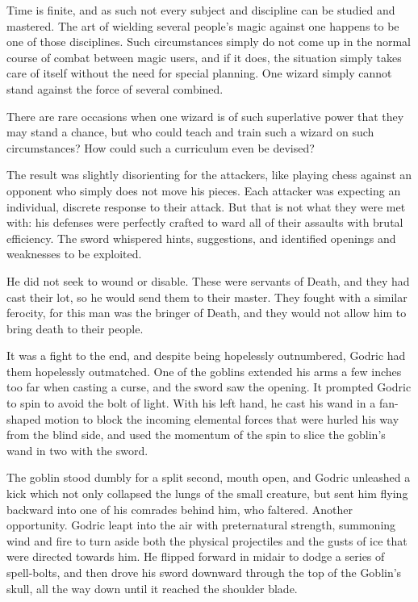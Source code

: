 Time is finite, and as such not every subject and discipline can be studied and mastered. The art of wielding several people’s magic against one happens to be one of those disciplines. Such circumstances simply do not come up in the normal course of combat between magic users, and if it does, the situation simply takes care of itself without the need for special planning. One wizard simply cannot stand against the force of several combined.

There are rare occasions when one wizard is of such superlative power that they may stand a chance, but who could teach and train such a wizard on such circumstances? How could such a curriculum even be devised?

The result was slightly disorienting for the attackers, like playing chess against an opponent who simply does not move his pieces. Each attacker was expecting an individual, discrete response to their attack. But that is not what they were met with: his defenses were perfectly crafted to ward all of their assaults with brutal efficiency. The sword whispered hints, suggestions, and identified openings and weaknesses to be exploited.

He did not seek to wound or disable. These were servants of Death, and they had cast their lot, so he would send them to their master. They fought with a similar ferocity, for this man was the bringer of Death, and they would not allow him to bring death to their people.

It was a fight to the end, and despite being hopelessly outnumbered, Godric had them hopelessly outmatched. One of the goblins extended his arms a few inches too far when casting a curse, and the sword saw the opening. It prompted Godric to spin to avoid the bolt of light. With his left hand, he cast his wand in a fan-shaped motion to block the incoming elemental forces that were hurled his way from the blind side, and used the momentum of the spin to slice the goblin’s wand in two with the sword.

The goblin stood dumbly for a split second, mouth open, and Godric unleashed a kick which not only collapsed the lungs of the small creature, but sent him flying backward into one of his comrades behind him, who faltered. Another opportunity. Godric leapt into the air with preternatural strength, summoning wind and fire to turn aside both the physical projectiles and the gusts of ice that were directed towards him. He flipped forward in midair to dodge a series of spell-bolts, and then drove his sword downward through the top of the Goblin’s skull, all the way down until it reached the shoulder blade.

